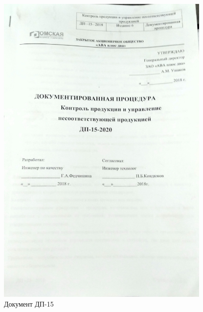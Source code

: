 \begin{figure}
\begin{center}
  \includegraphics[height=0.94\textheight, width=0.94\textwidth, keepaspectratio]{Pics 1/6 ДП ОТК.jpg }
\end{center}
  \caption{Документ ДП-15}
  \label{pic:6 ДП ОТК }
\end{figure}

